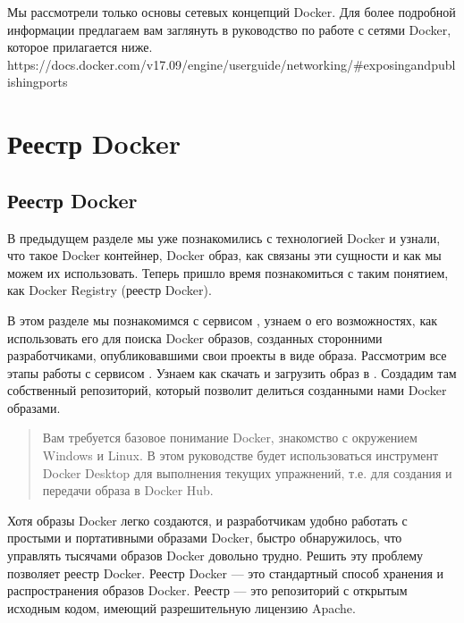 \documentclass[letterpaper,10pt,russian]{sphinxmanual}
\begin{document}
\sphinxAtStartPar
Мы рассмотрели только основы сетевых концепций Docker. Для более подробной информации предлагаем вам заглянуть в руководство по работе с сетями Docker, которое прилагается ниже.
https://docs.docker.com/v17.09/engine/userguide/networking/\#exposing\sphinxhyphen{}and\sphinxhyphen{}publishing\sphinxhyphen{}ports


\chapter{Реестр Docker}
\label{\detokenize{index:id19}}
\sphinxstepscope


\section{Реестр Docker}
\label{\detokenize{educational_materials/docker_hub/content:docker}}\label{\detokenize{educational_materials/docker_hub/content::doc}}
\sphinxAtStartPar
В предыдущем разделе мы уже познакомились с технологией Docker и узнали, что такое Docker контейнер, Docker образ, как связаны эти сущности и как мы можем их использовать. Теперь пришло время познакомиться с таким понятием, как Docker Registry (реестр Docker).

\sphinxAtStartPar
В этом разделе мы познакомимся с сервисом , узнаем о его возможностях, как использовать его для поиска Docker образов, созданных сторонними разработчиками, опубликовавшими свои проекты в виде образа.
Рассмотрим все этапы работы с сервисом . Узнаем как скачать и загрузить образ в . Создадим там собственный репозиторий, который позволит делиться созданными нами Docker образами.
\begin{quote}

\sphinxAtStartPar
Вам требуется базовое понимание Docker, знакомство с окружением Windows и Linux. В этом руководстве будет использоваться инструмент Docker Desktop для выполнения текущих упражнений, т.е. для создания и передачи образа в Docker Hub.
\end{quote}

\sphinxAtStartPar
Хотя образы Docker легко создаются, и разработчикам удобно работать с простыми и портативными образами Docker, быстро обнаружилось, что управлять тысячами образов Docker довольно трудно. Решить эту проблему позволяет реестр Docker. Реестр Docker — это стандартный способ хранения и распространения образов Docker. Реестр — это репозиторий с открытым исходным кодом, имеющий разрешительную лицензию Apache.
\end{document}
